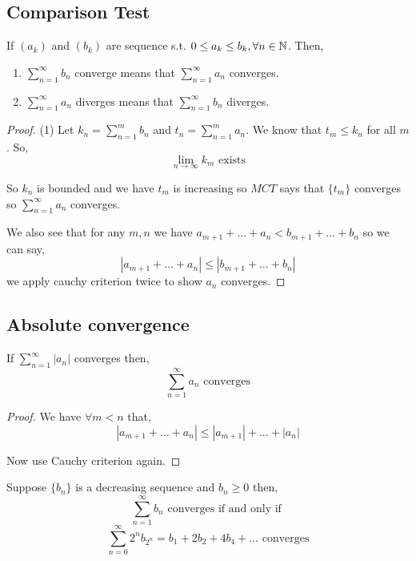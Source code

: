 \subsection{Comparison Test}
\begin{theorem}
	If $(a_k)$ and $(b_k)$ are sequence s.t. $0 \le a_k \le b_k, \forall n \in \mathbb{N}$. Then,
	\begin{enumerate}
		\item $\sum_{n = 1}^{\infty} b_n$ converge means that $\sum_{n = 1}^{\infty} a_n$ converges.
		\item $\sum_{n = 1}^{\infty} a_n$ diverges means that $\sum_{n = 1}^{\infty} b_n$ diverges.
	\end{enumerate}
\end{theorem}	
\begin{proof}(1)
Let $k_n = \sum_{n = 1}^{m} b_n $ and $t_n = \sum_{n = 1}^{m} a_n$.  We know that $t_m \le k_n$ for all $m$. So, 
$$
\lim_{n \to \infty} k_m \text{ exists}
$$

So $k_n$ is bounded and we have $t_m$ is increasing so $MCT$ says that $\{t_m\}$ converges so $\sum_{n = 1}^{\infty} a_n$ converges.

\vspace{1em}

We also see that for any $m, n$ we have $a_{m + 1} + \dots + a_n < b_{m + 1}+ \dots + b_n$ so we can say,
$$
\left | a_{m + 1} + \dots + a_{n} \right | \le \left | b_{m + 1} + \dots + b_n \right |
$$
we apply cauchy criterion twice  to show $a_n$ converges.
\end{proof}

\subsection{Absolute convergence}
\begin{theorem}
	If $\sum_{n = 1}^{\infty} |a_n|$ converges then,
	$$
	\sum_{n = 1}^{\infty} a_n \text{ converges}
	$$ 
\end{theorem}
\begin{proof}
	We have $\forall m < n$	 that,
	$$
	\left | a_{m + 1} + \dots + a_n \right | \le 	\left | a_{m + 1} \right | + \dots + \left |a_n \right |
	$$

	Now use Cauchy criterion again.
\end{proof}	



\begin{theorem}
	Suppose $\{b_n\}$ is a decreasing sequence and $b_n \ge 0$ then,
	$$
	\sum_{n = 1}^{\infty} b_n \text{ converges if and only if }
	$$
	$$
	 \sum_{n = 0}^{\infty} 2^{n}b_{2^{n}} = b_{1} + 2b_{2} + 4b_{4} + \dots \text{ converges}
	$$
\end{theorem}

